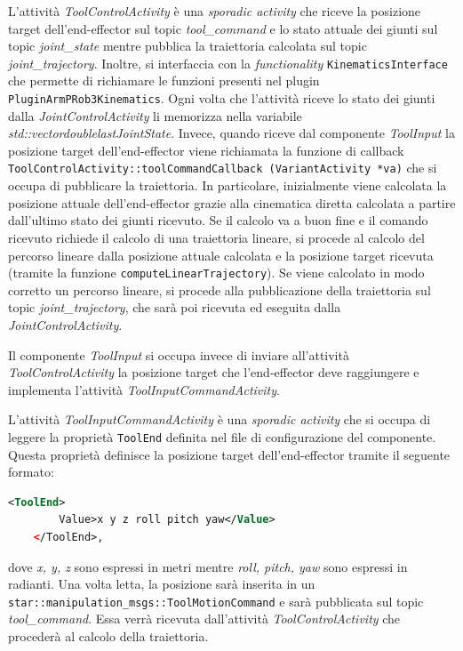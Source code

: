 L'attività \textit{ToolControlActivity} è una \textit{sporadic activity} che riceve la posizione target dell'end-effector sul topic \textit{tool\_command} e lo stato attuale dei giunti sul topic \textit{joint\_state} mentre pubblica la traiettoria calcolata sul topic \textit{joint\_trajectory}. Inoltre, si interfaccia con la \textit{functionality} \texttt{KinematicsInterface} che permette di richiamare le funzioni presenti nel plugin \texttt{PluginArmPRob3Kinematics}. Ogni volta che l'attività riceve lo stato dei giunti dalla \textit{JointControlActivity} li memorizza nella variabile \textit{std::vector\tl double\tr lastJointState}. Invece, quando riceve dal componente \textit{ToolInput} la posizione target dell'end-effector viene richiamata la funzione di callback \texttt{ToolControlActivity::toolCommandCallback (VariantActivity *va)} che si occupa di pubblicare la traiettoria. In particolare, inizialmente viene calcolata la posizione attuale dell'end-effector grazie alla cinematica diretta calcolata a partire dall'ultimo stato dei giunti ricevuto. Se il calcolo va a buon fine e il comando ricevuto richiede il calcolo di una traiettoria lineare, si procede al calcolo del percorso lineare dalla posizione attuale calcolata e la posizione target ricevuta (tramite la funzione \texttt{computeLinearTrajectory}). Se viene calcolato in modo corretto un percorso lineare, si procede alla pubblicazione della traiettoria sul topic \textit{joint\_trajectory}, che sarà poi ricevuta ed eseguita dalla \textit{JointControlActivity}.

Il componente \textit{ToolInput} si occupa invece di inviare all'attività \textit{ToolControlActivity} la posizione target che l'end-effector deve raggiungere e implementa l'attività \textit{ToolInputCommandActivity}.

L'attività \textit{ToolInputCommandActivity} è una \textit{sporadic activity} che si occupa di leggere la proprietà \texttt{ToolEnd} definita nel file di configurazione del componente. Questa proprietà definisce la posizione target dell'end-effector tramite il seguente formato:
\begin{lstlisting}[language=xml]
	<ToolEnd>
		Value>x y z roll pitch yaw</Value>
	</ToolEnd>,
\end{lstlisting}
dove \textit{x, y, z} sono espressi in metri mentre \textit{roll, pitch, yaw} sono espressi in radianti. Una volta letta, la posizione sarà inserita in un \texttt{star::manipulation\_msgs::ToolMotionCommand} e sarà pubblicata sul topic \textit{tool\_command}. Essa verrà ricevuta dall'attività \textit{ToolControlActivity} che procederà al calcolo della traiettoria.